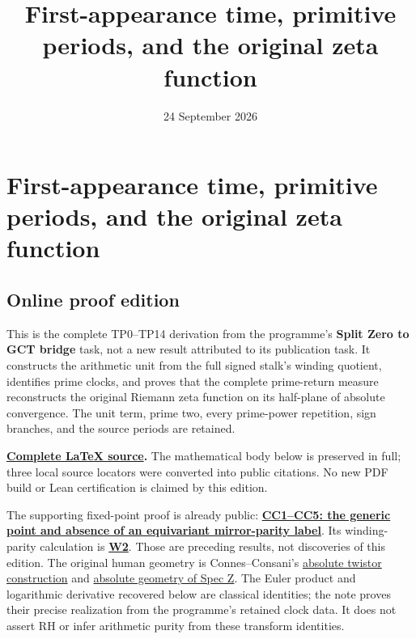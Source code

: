 \documentclass[
]{article}
\title{First-appearance time, primitive periods, and the original zeta
function}
\author{}
\date{24 September 2026}
\begin{document}
\maketitle

\section{First-appearance time, primitive periods, and the original zeta
function}\label{first-appearance-time-primitive-periods-and-the-original-zeta-function}

\subsection{Online proof edition}\label{online-proof-edition}

This is the complete TP0--TP14 derivation from the programme's
\textbf{Split Zero to GCT bridge} task, not a new result attributed to
its publication task. It constructs the arithmetic unit from the full
signed stalk's winding quotient, identifies prime clocks, and proves
that the complete prime-return measure reconstructs the original Riemann
zeta function on its half-plane of absolute convergence. The unit term,
prime two, every prime-power repetition, sign branches, and the source
periods are retained.

\textbf{\href{README.tex}{Complete LaTeX source}.} The mathematical body
below is preserved in full; three local source locators were converted
into public citations. No new PDF build or Lean certification is claimed
by this edition.

The supporting fixed-point proof is already public:
\textbf{\href{https://github.com/KokunoYumeto/zeta-function-research-reader/blob/6bc7202eceb05d1a482d495ad302803a80b5aeca/workbenches/splitzero-tandem/temporary-arguments/20260924-fixed-generic-point-purity/prime-clocks-p14/CC_FIXED_GENERIC_POINT_AND_MIRROR_PARITY.md}{CC1--CC5:
the generic point and absence of an equivariant mirror-parity label}}.
Its winding-parity calculation is
\textbf{\href{https://github.com/KokunoYumeto/zeta-function-research-reader/blob/6bc7202eceb05d1a482d495ad302803a80b5aeca/workbenches/splitzero-tandem/temporary-arguments/20260924-fixed-generic-point-purity/prime-clocks-p14/WINDING_PARITY_AND_INTEGER_SPECTRUM.md\#L55-L85}{W2}}.
Those are preceding results, not discoveries of this edition. The
original human geometry is Connes--Consani's
\href{https://arxiv.org/html/2609.00299v1}{absolute twistor
construction} and \href{https://arxiv.org/html/2606.06604v1}{absolute
geometry of Spec Z}. The Euler product and logarithmic derivative
recovered below are classical identities; the note proves their precise
realization from the programme's retained clock data. It does not assert
RH or infer arithmetic purity from these transform identities.
\end{document}
